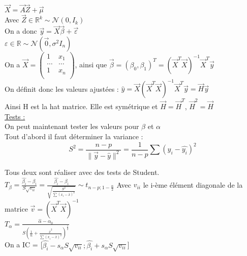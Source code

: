 \documentclass[../main.tex]{subfiles}
\begin{document}
$\vec{X} = \vec{A} \vec{Z} + \vec{\mu}$\\
Avec $ \vec{Z} \in \mathbb{R}^k \sim \mathcal{N}(0,I_k)$\\
On a donc $\vec{y} = \vec{X} \vec{\beta} + \vec{\varepsilon}$\\
$\varepsilon \in \mathbb{R} \sim \mathcal{N}(\vec{0}, \sigma^2 I_n)$\\

On a $\vec{X} = \begin{pmatrix}
    1 & x_1\\
    \dots & \dots\\
    1 & x_n\\
\end{pmatrix}$, ainsi que $\vec{\beta} = (\beta_0, \beta_1)^T = (\vec{X}^T\vec{X})^{-1} \vec{X}^T \vec{y} $\\

On définit donc les valeurs ajustées : $\hat{y} = \vec{X}(\vec{X}^T\vec{X})^{-1} \vec{X}^T \vec{y} = \vec{H} \vec{y}$\\
Ainsi H est la hat matrice. Elle est symétrique et $\vec{H} = \vec{H}^T$, $\vec{H}^2 = \vec{H}$\\


\quad \underline{Tests :}\\
On peut maintenant tester les valeurs pour $\beta$ et $\alpha$\\
Tout d'abord il faut déterminer la variance : \\
\begin{equation}
    S^2 = \frac{n-p}{\parallel \vec{y} - \hat{y} \parallel^2} = \frac{1}{n-p} \sum (y_i - \hat{y_i})^2
\end{equation}

Tous deux sont réaliser avec des tests de Student.\\
$T_{\beta} = \frac{\hat{\beta_i} - \beta_i}{S\sqrt{v_{ii}}} = \frac{\hat{\beta_i} - \beta_i}{\sqrt{\frac{S^2}{\sum (x_i-\overline{x})^2}}} \sim t_{n-p; 1-\frac{\alpha}{2}}$
Avec $v_{ii}$ le i-ème élément diagonale de la matrice $\vec{v} = (\vec{X}^T\vec{X})^{-1}$\\

$T_{\alpha} = \frac{\hat{\alpha} - \alpha_0}{S ( \frac{1}{n}+ \frac{\overline{x}^2}{\sum (x_i-\overline{x})^2})^{\frac{1}{2}}}$\\

On a IC = [$\hat{\beta_i}-s_{\alpha} S \sqrt{v_{ii}}; \hat{\beta_i}+s_{\alpha} S \sqrt{v_{ii}}$]
\end{document}
